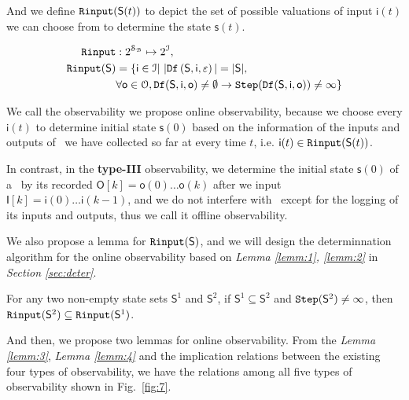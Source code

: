 And we define ${\tt Rinput}(\mathsf{S}(t))$ to depict the set of possible valuations of input $\mathsf{i}(t)$ we can choose from to determine the state $\mathsf{s}(t)$.

\begin{equation}
\begin{split}
{\tt Rinput}&:2^{\mathcal{S}_{\mathcal{B}}} \mapsto2^{\mathcal{I}},\\
{\tt Rinput}(\mathsf{S})&=\{\mathsf{i}\in \mathcal{I}|\  |{\tt Df}\left(\mathsf{S},\mathsf{i},\varepsilon\right)|=|\mathsf{S}|, \\
&\forall \mathsf{o} \in \mathcal{O}, {\tt Df}(\mathsf{S},\mathsf{i},\mathsf{o})\ne \emptyset \rightarrow {\tt Step}({\tt Df}(\mathsf{S},\mathsf{i},\mathsf{o}))\ne \infty\}
\end{split}
\end{equation}

We call the observability we propose online observability, because we choose every $\mathsf{i}(t)$ to determine initial state $\mathsf{s}(0)$ based on the information of the inputs and outputs of \BCN\ we have collected so far at every time $t$, i.e. $\mathsf{i}(t)\in{\tt Rinput}(\mathsf{S}(t))$. 

In contrast, in the {\bf type-III} observability, we determine the initial state $\mathsf{s}(0)$ of a \BCN\ by its recorded $\mathsf{O}[k]=\mathsf{o}(0)\ldots\mathsf{o}(k)$ after we input $\mathsf{I}[k]=\mathsf{i}(0)\ldots\mathsf{i}(k-1)$, and  we do not interfere with \BCN\ except for the logging of its inputs and outputs, thus we call it offline observability.

We also propose a lemma for ${\tt Rinput}(\mathsf{S})$, and we will design the determinnation algorithm for the online observability based on {\em Lemma \ref{lemm:1}, \ref{lemm:2}} in {\em Section \ref{sec:deter}}.
\begin{lemma}
For any two non-empty state sets  $\mathsf{S}^{1}$ and $\mathsf{S}^{2}$, if $\mathsf{S}^{1}\subseteq\mathsf{S}^{2}$ and ${\tt Step}(\mathsf{S}^{2})\ne\infty$, then ${\tt Rinput}(\mathsf{S}^2)\subseteq{\tt Rinput}(\mathsf{S}^1)$.
\label{lemm:2}
\end{lemma}





And then, we propose two lemmas for online observability. From the {\em Lemma \ref{lemm:3}}, {\em Lemma \ref{lemm:4}} and the implication relations between the existing four types of observability, we have the relations among all five types of observability shown in Fig.~\ref{fig:7}.

